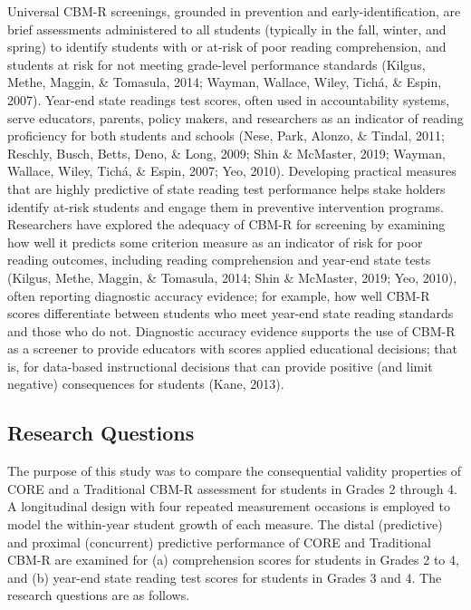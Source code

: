 \documentclass[
  english,
  man, fleqn, noextraspace]{apa6}
\begin{document}
Universal CBM-R screenings, grounded in prevention and early-identification, are brief assessments administered to all students (typically in the fall, winter, and spring) to identify students with or at-risk of poor reading comprehension, and students at risk for not meeting grade-level performance standards (Kilgus, Methe, Maggin, \& Tomasula, 2014; Wayman, Wallace, Wiley, Tichá, \& Espin, 2007). Year-end state readings test scores, often used in accountability systems, serve educators, parents, policy makers, and researchers as an indicator of reading proficiency for both students and schools (Nese, Park, Alonzo, \& Tindal, 2011; Reschly, Busch, Betts, Deno, \& Long, 2009; Shin \& McMaster, 2019; Wayman, Wallace, Wiley, Tichá, \& Espin, 2007; Yeo, 2010). Developing practical measures that are highly predictive of state reading test performance helps stake holders identify at-risk students and engage them in preventive intervention programs. Researchers have explored the adequacy of CBM-R for screening by examining how well it predicts some criterion measure as an indicator of risk for poor reading outcomes, including reading comprehension and year-end state tests (Kilgus, Methe, Maggin, \& Tomasula, 2014; Shin \& McMaster, 2019; Yeo, 2010), often reporting diagnostic accuracy evidence; for example, how well CBM-R scores differentiate between students who meet year-end state reading standards and those who do not. Diagnostic accuracy evidence supports the use of CBM-R as a screener to provide educators with scores applied educational decisions; that is, for data-based instructional decisions that can provide positive (and limit negative) consequences for students (Kane, 2013).

\hypertarget{research-questions}{%
\subsection{Research Questions}\label{research-questions}}

The purpose of this study was to compare the consequential validity properties of CORE and a Traditional CBM-R assessment for students in Grades 2 through 4. A longitudinal design with four repeated measurement occasions is employed to model the within-year student growth of each measure. The distal (predictive) and proximal (concurrent) predictive performance of CORE and Traditional CBM-R are examined for (a) comprehension scores for students in Grades 2 to 4, and (b) year-end state reading test scores for students in Grades 3 and 4. The research questions are as follows.
\end{document}
